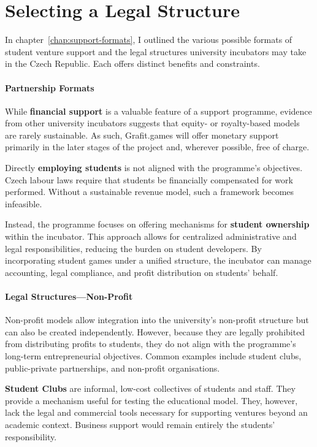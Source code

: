 \section{Selecting a Legal Structure}
In chapter~\ref{chap:support-formats}, I outlined the various possible formats of student venture support and the legal structures university incubators may take in the Czech Republic. Each offers distinct benefits and constraints.

\paragraph{Partnership Formats}
While \textbf{financial support} is a valuable feature of a support programme, evidence from other university incubators suggests that equity- or royalty-based models are rarely sustainable. As such, Grafit.games will offer monetary support primarily in the later stages of the project and, wherever possible, free of charge.

Directly \textbf{employing students} is not aligned with the programme’s objectives. Czech labour laws require that students be financially compensated for work performed. Without a sustainable revenue model, such a framework becomes infeasible.

Instead, the programme focuses on offering mechanisms for \textbf{student ownership} within the incubator. This approach allows for centralized administrative and legal responsibilities, reducing the burden on student developers. By incorporating student games under a unified structure, the incubator can manage accounting, legal compliance, and profit distribution on students’ behalf.

\paragraph{Legal Structures—Non-Profit}
Non-profit models allow integration into the university’s non-profit structure but can also be created independently. However, because they are legally prohibited from distributing profits to students, they do not align with the programme’s long-term entrepreneurial objectives. Common examples include student clubs, public-private partnerships, and non-profit organisations.

\textbf{Student Clubs} are informal, low-cost collectives of students and staff. They provide a mechanism useful for testing the educational model. They, however, lack the legal and commercial tools necessary for supporting ventures beyond an academic context. Business support would remain entirely the students’ responsibility.

